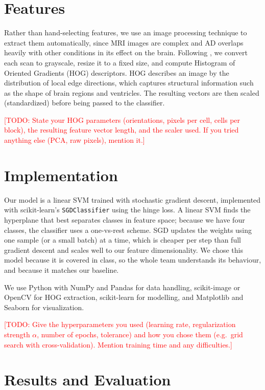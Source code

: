 \documentclass[11pt]{article}
\newcommand{\todo}[1]{\textcolor{red}{[TODO: #1]}}
\begin{document}
\section{Features}

Rather than hand-selecting features, we use an image processing technique to extract them automatically, since MRI images are complex and AD overlaps heavily with other conditions in its effect on the brain. Following \citet{vengala2024}, we convert each scan to grayscale, resize it to a fixed size, and compute Histogram of Oriented Gradients (HOG) descriptors. HOG describes an image by the distribution of local edge directions, which captures structural information such as the shape of brain regions and ventricles. The resulting vectors are then scaled (standardized) before being passed to the classifier.

\todo{State your HOG parameters (orientations, pixels per cell, cells per block), the resulting feature vector length, and the scaler used. If you tried anything else (PCA, raw pixels), mention it.}

\section{Implementation}

Our model is a linear SVM trained with stochastic gradient descent, implemented with scikit-learn's \texttt{SGDClassifier} using the hinge loss. A linear SVM finds the hyperplane that best separates classes in feature space; because we have four classes, the classifier uses a one-vs-rest scheme. SGD updates the weights using one sample (or a small batch) at a time, which is cheaper per step than full gradient descent and scales well to our feature dimensionality. We chose this model because it is covered in class, so the whole team understands its behaviour, and because it matches our baseline.

We use Python with NumPy and Pandas for data handling, scikit-image or OpenCV for HOG extraction, scikit-learn for modelling, and Matplotlib and Seaborn for visualization.

\todo{Give the hyperparameters you used (learning rate, regularization strength $\alpha$, number of epochs, tolerance) and how you chose them (e.g.\ grid search with cross-validation). Mention training time and any difficulties.}

\section{Results and Evaluation}
\end{document}
